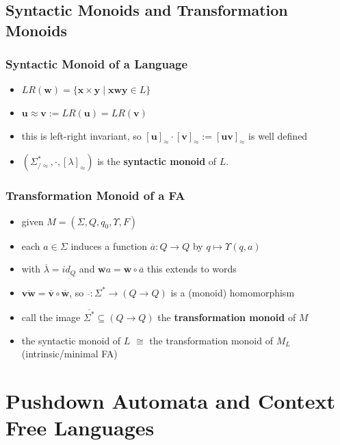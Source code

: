 \documentclass{beamer}
\begin{document}

\subsection{Syntactic Monoids and Transformation Monoids}
\begin{frame}
\frametitle{Syntactic Monoid of a Language}
\begin{itemize}
  \item $LR(\mathbf{w}) = \{\mathbf{x} \times \mathbf{y} \mid \mathbf{xwy} \in L\}$
  \item $\mathbf{u} \approx \mathbf{v} := LR(\mathbf{u}) = LR(\mathbf{v})$
  \item this is left-right invariant, so $[\mathbf{u}]_\approx
    \cdot [\mathbf{v}]_\approx := [\mathbf{uv}]_\approx$ is well defined
  \item $(\Sigma^*_{/ \approx}, \cdot, [\lambda]_\approx)$ is the
    \textbf{syntactic monoid} of $L$.
\end{itemize}
\end{frame}


\begin{frame}
\frametitle{Transformation Monoid of a FA}
\begin{itemize}
\item given $M = (\Sigma, Q, q_0, \Upsilon, F)$
\item each $a \in \Sigma$ induces a function $\overline{a} : Q \rightarrow Q$
    by $q \mapsto \Upsilon(q, a)$
\item with $\overline{\lambda} = id_{Q}$ and $\overline{\mathbf{w}a} =
        \overline{\mathbf{w}} \circ \overline{a}$ this extends to words
\item $\overline{\mathbf{vw}} = \overline{\mathbf{v}} \circ
  \overline{\mathbf{w}}$, so $\overline{} : \Sigma^* \rightarrow (Q \rightarrow
  Q)$ is a (monoid) homomorphism
\item call the image $\overline{\Sigma^*} \subseteq (Q \rightarrow Q)$ the
  \textbf{transformation monoid} of $M$
\item the syntactic monoid of $L$ $\cong$ the transformation monoid of $M_L$
  (intrinsic/minimal FA)
\end{itemize}
\end{frame}


\section{Pushdown Automata and Context Free Languages}
\end{document}
